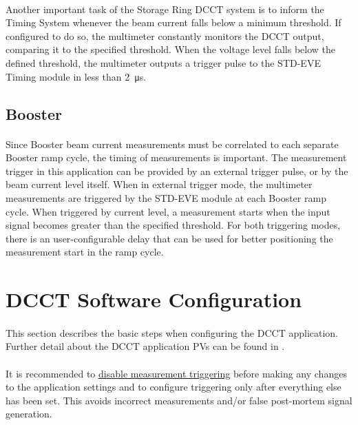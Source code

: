 \documentclass[openany]{article}
\begin{document}
		\paragraph{} Another important task of the Storage Ring DCCT system is to inform the Timing System whenever the beam current falls below a minimum threshold. If configured to do so, the multimeter constantly monitors the DCCT output, comparing it to the specified threshold. When the voltage level falls below the defined threshold, the multimeter outputs a trigger pulse to the STD-EVE Timing module in less than \SI{2}{\micro\second}.

	\subsection{Booster} 

		\paragraph{} Since Booster beam current measurements must be correlated to each separate Booster ramp cycle, the timing of measurements is important. The measurement trigger in this application can be provided by an external trigger pulse, or by the beam current level itself. When in external trigger mode, the multimeter measurements are triggered by the STD-EVE module at each Booster ramp cycle. When triggered by current level, a measurement starts when the input signal becomes greater than the specified threshold. For both triggering modes, there is an user-configurable delay that can be used for better positioning the measurement start in the ramp cycle.

\section{DCCT Software Configuration}

	\paragraph{} This section describes the basic steps when configuring the DCCT application. Further detail about the DCCT application PVs can be found in \emph{}.

	\paragraph{} It is recommended to \hyperref[disable-triggering]{disable measurement triggering} before making any changes to the application settings and to configure triggering only after everything else has been set. This avoids incorrect measurements and/or false post-mortem signal generation.
\end{document}
